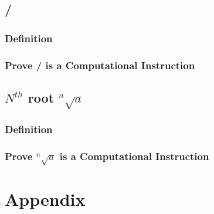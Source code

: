 \documentclass[11pt]{article}
\begin{document}
\subsection{/}
\subsubsection{Definition}
\subsubsection{Prove / is a Computational Instruction}







\subsection{$N^{th}$ root $^n \sqrt{a}$}
\subsubsection{Definition}
\subsubsection{Prove $^n \sqrt{a}$  is a Computational Instruction}



\section*{Appendix}

\newpage
\end{document}
